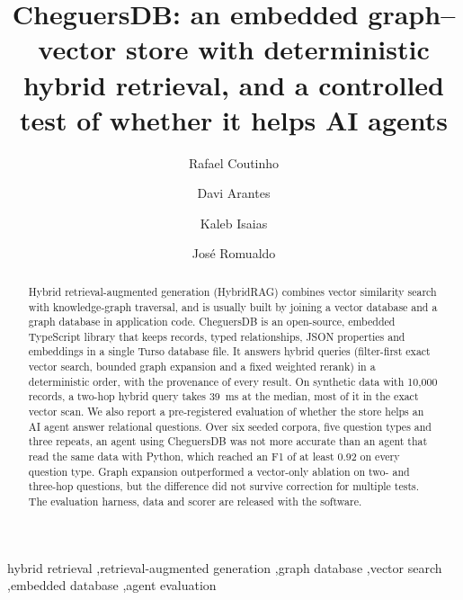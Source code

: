 \documentclass[preprint,12pt,a4paper]{elsarticle}
\begin{document}
\begin{frontmatter}

\title{CheguersDB: an embedded graph--vector store with deterministic hybrid retrieval, and a controlled test of whether it helps AI agents}

\author[inteli]{Rafael Coutinho}
\author[inteli]{Davi Arantes}
\author[inteli]{Kaleb Isaias}
\author[inteli]{Jos\'e Romualdo}

\address[inteli]{Instituto de Tecnologia e Lideran\c{c}a (Inteli), Av.\ Prof.\ Almeida Prado, 520, Butant\~a, S\~ao Paulo, SP, 05508-070, Brazil}


\begin{abstract}
Hybrid retrieval-augmented generation (HybridRAG) combines vector similarity search with knowledge-graph traversal, and is usually built by joining a vector database and a graph database in application code. CheguersDB is an open-source, embedded TypeScript library that keeps records, typed relationships, JSON properties and embeddings in a single Turso database file. It answers hybrid queries (filter-first exact vector search, bounded graph expansion and a fixed weighted rerank) in a deterministic order, with the provenance of every result. On synthetic data with 10,000 records, a two-hop hybrid query takes 39~ms at the median, most of it in the exact vector scan. We also report a pre-registered evaluation of whether the store helps an AI agent answer relational questions. Over six seeded corpora, five question types and three repeats, an agent using CheguersDB was not more accurate than an agent that read the same data with Python, which reached an F1 of at least 0.92 on every question type. Graph expansion outperformed a vector-only ablation on two- and three-hop questions, but the difference did not survive correction for multiple tests. The evaluation harness, data and scorer are released with the software.
\end{abstract}

\begin{keyword}
hybrid retrieval \sep retrieval-augmented generation \sep graph database \sep vector search \sep embedded database \sep agent evaluation
\end{keyword}

\end{frontmatter}
\end{document}
